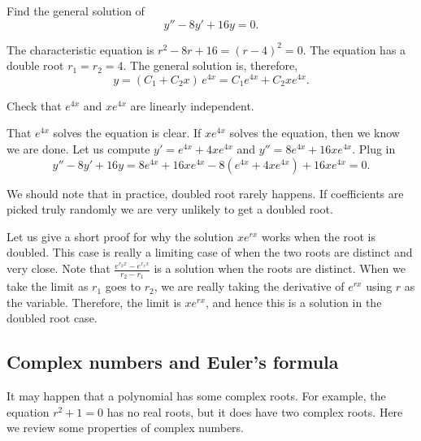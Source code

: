 \documentclass[12pt]{book}
\begin{document}
\begin{example}
Find the general solution of
\begin{equation*}
y'' -8 y' + 16 y = 0 .
\end{equation*}

The characteristic equation is $r^2 - 8 r + 16 = {(r-4)}^2 = 0$.
The equation has a 
double root $r_1 = r_2 = 4$.  The general solution is, therefore,
\begin{equation*}
y = (C_1 + C_2 x)\, e^{4 x} = C_1 e^{4x} + C_2 x e^{4x} .
\end{equation*}

\begin{exercise}
Check that $e^{4x}$ and $x e^{4x}$ are linearly independent.
\end{exercise}

That $e^{4x}$ solves the equation is clear.  If $x e^{4x}$ solves the
equation, then we know we are done.  Let us compute
$y' = e^{4x} + 4xe^{4x}$ and
$y'' = 8 e^{4x} + 16xe^{4x}$.  Plug in
\begin{equation*}
y'' - 8 y' + 16 y = 
8 e^{4x} + 16xe^{4x} - 8(e^{4x} + 4xe^{4x}) + 16 xe^{4x} = 
0 .
\end{equation*}
\end{example}

We should note that in practice, doubled root rarely happens.  If
coefficients are 
picked truly randomly we are very unlikely to get a doubled root.

Let us give a short proof for why the solution $x e^{r x}$ works when the
root is doubled.  This case is really a limiting case of when
the two roots are distinct and very close.  Note that 
$\frac{e^{r_2 x} - e^{r_1 x}}{r_2 - r_1}$ is a solution when the roots are
distinct.  When we take the limit as $r_1$ goes to $r_2$, we are really
taking the
derivative of $e^{rx}$ using $r$ as the variable.  Therefore, the limit is 
$x e^{rx}$, and hence this is a solution in the doubled root case.

\subsection{Complex numbers and Euler's formula}

It may happen that a polynomial has some complex roots.  For example, the
equation $r^2 + 1 = 0$ has no real roots, but it does have two complex roots.
Here we review some properties of complex numbers.

\medskip
\end{document}
